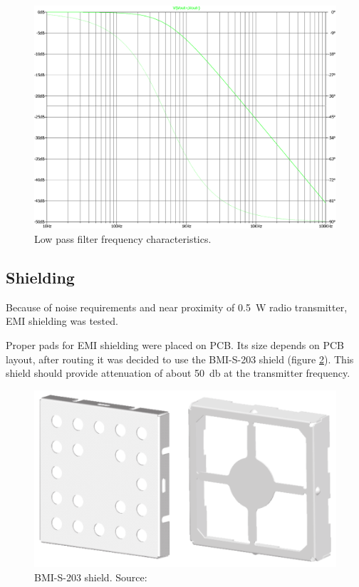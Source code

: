         \begin{figure}[H]
            \centering
            \includegraphics[width=0.7\paperwidth]{img/06/low_pass_filter_output.eps}
            \caption{Low pass filter frequency characteristics.}
            \label{low_pass_filter_output}
        \end{figure}

    \subsection{Shielding}
        Because of noise requirements and near proximity of \SI{0.5}{\watt} radio transmitter, EMI shielding was tested.

        Proper pads for EMI shielding were placed on PCB. Its size depends on PCB layout, after routing it was decided to use the BMI-S-203 shield (figure \ref{BMI-S-203}). This shield should provide attenuation of about \SI{50}{\decibel} at the transmitter frequency.

        \begin{figure}[H]
            \centering
            \includegraphics[width=0.7\paperwidth]{img/06/BMI-S-203.eps}
            \caption{BMI-S-203 shield. Source: \cite{EMI_shieldings_catalog}}
            \label{BMI-S-203}
        \end{figure}


